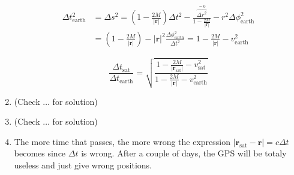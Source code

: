 \documentclass[a4paper,10pt,english]{article}
\begin{document}
\begin{enumerate}
\begin{align*}
\Delta t_{\text{earth}}^{2}&=\Delta s^{2}=\left(1-\frac{2M}{|\textbf{r}|}\right)\Delta t^{2}-\frac{\overbrace{\Delta r^{2}}^{=0}}{1-\frac{2M}{|\textbf{r}|}}-r^{2}\Delta\phi^{2}_{\text{earth}}\\
&=\left(1-\frac{2M}{|\textbf{r}|}\right)-|\textbf{r}|^{2}\frac{\Delta\phi^{2}_{\text{earth}}}{\Delta t^{2}}=1-\frac{2M}{|\textbf{r}|}-v_{\text{earth}}^{2}
\end{align*}

\begin{equation*}
\frac{\Delta t_{\text{sat}}}{\Delta t_{\text{earth}}}=\sqrt{\frac{1-\frac{2M}{|\textbf{r}_{\text{sat}}|}-v_{\text{sat}}^{2}}{1-\frac{2M}{|\textbf{r}|}-v_{\text{earth}}^{2}}}
\end{equation*}

\item (Check $\ldots$ for solution)

\item (Check $\ldots$ for solution)

\item The more time that passes, the more wrong the expression $|\textbf{r}_{\text{sat}}-\textbf{r}|=c\Delta t$ becomes since $\Delta t$ is wrong. After a couple of days, the GPS will be totaly useless and just give wrong positions.

\end{enumerate}
\end{document}

